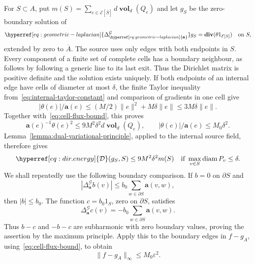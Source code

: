 \documentclass[12pt]{amsart}
\numberwithin{equation}{section}
\DeclareMathOperator{\diam}{{\mathop{diam}}}
\renewcommand{\div}{\mathop{\bf div}}
\newcommand{\E}{\mathcal{E}}
\newcommand{\eps}{\varepsilon}
\newcommand{\aDelta}{\hyperref[eq:geometric-laplacian]{{\Delta^{\mathcal{G}}_{\cond}}}}
\newcommand{\cond}{\hyperref[eq:geometric-laplacian]{\mathbf{a}}}
\newcommand{\D}{\hyperref[eq:dir.energy]{\mathcal{D}}}
\DeclareMathOperator{\vol}{\mathbf{vol}}
\begin{document}
For $S\subset A$, put $m(S)=\sum_{e\in\E[\overline S]}d\vol_d(Q_e)$ and let $g_S$ be the zero-boundary solution of
\[
 \aDelta g_S=\div(\theta 1_{\E[S]})\quad\hbox{on }S,
\]
extended by zero to $\overline A$. The source uses only edges with both endpoints in $S$. Every component of a finite set of complete cells has a boundary neighbour, as follows by following a generic line to its last exit. Thus the Dirichlet matrix is positive definite and the solution exists uniquely.
If both endpoints of an internal edge have cells of diameter at most $\delta$, the finite Taylor inequality from~\eqref{eq:internal-taylor-constant} and comparison of gradients in one cell give
\[
 |\theta(e)|/\cond(e)\le (M/2)\|e\|^2+M\delta\|e\|
 \le3M\delta\|e\|.
\]
Together with~\eqref{eq:cell-flux-bound}, this proves
\begin{equation}\label{eq:internal-flux}
 \cond(e)^{-1}\theta(e)^2\le9M^2\delta^2d\vol_d(Q_e),
 \qquad |\theta(e)|/\cond(e)\le M_0\delta^2.
\end{equation}
Lemma~\ref{lemma:dual-variational-principle}, applied to the internal source field, therefore gives
\begin{equation}\label{eq:internal-energy}
 \D(g_S,S)\le9M^2\delta^2m(S)
 \quad\hbox{if }\max_{v\in S}\diam P_v\le\delta.
\end{equation}
We shall repeatedly use the following boundary comparison. If $b=0$ on $\partial S$ and
\[
 |\aDelta b(v)|\le b_0\sum_{w\in\partial S}\cond(v,w),
\]
then $|b|\le b_0$. The function $c=b_0 1_S$, zero on $\partial S$, satisfies
\[
 \aDelta c(v)=-b_0\sum_{w\in\partial S}\cond(v,w).
\]
Thus $b-c$ and $-b-c$ are subharmonic with zero boundary values, proving the assertion by the maximum principle. Apply this to the boundary edges in $f-g_A$, using~\eqref{eq:cell-flux-bound}, to obtain
\begin{equation}\label{eq:initial-boundary-correction}
 \|f-g_A\|_\infty\le M_0\eps^2.
\end{equation}
\end{document}
